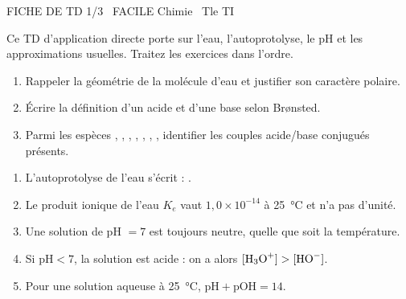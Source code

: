 \documentclass[11pt]{article}
\begin{document}
\begin{tcolorbox}[enhanced,colback=popink,colframe=popink,arc=10pt,boxrule=0pt,left=12pt,right=12pt,top=9pt,bottom=9pt]
{\color{white}\popxbold\small FICHE DE TD 1/3 \textbullet\ FACILE \hfill Chimie \textbullet\ Tle TI\par}
\end{tcolorbox}
\vspace{4pt}
\noindent Ce TD d'application directe porte sur l'eau, l'autoprotolyse, le pH et les approximations usuelles. Traitez les exercices dans l'ordre.

\begin{exercice}
\begin{enumerate}
    \item Rappeler la géométrie de la molécule d'eau et justifier son caractère polaire.
    \item Écrire la définition d'un acide et d'une base selon Brønsted.
    \item Parmi les espèces , , , , , , , identifier les couples acide/base conjugués présents.
\end{enumerate}
\end{exercice}

\begin{exercice}
\begin{enumerate}
    \item L'autoprotolyse de l'eau s'écrit : .
    \item Le produit ionique de l'eau $K_e$ vaut $1,0 \times 10^{-14}$ à \SI{25}{\celsius} et n'a pas d'unité.
    \item Une solution de pH $= 7$ est toujours neutre, quelle que soit la température.
    \item Si $\mathrm{pH} < 7$, la solution est acide : on a alors $[\ce{H3O+}] > [\ce{HO-}]$.
    \item Pour une solution aqueuse à \SI{25}{\celsius}, $\mathrm{pH} + \mathrm{pOH} = 14$.
\end{enumerate}
\end{exercice}
\end{document}
